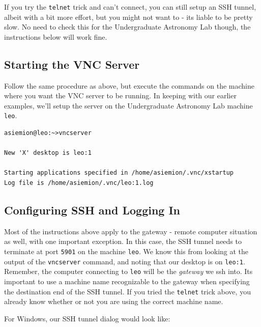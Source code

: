 \documentclass[11pt,preprint]{aastex}
\begin{document}
If you try the \verb$telnet$ trick and can't connect, you can still setup an SSH tunnel, albeit with a bit
more effort, but you might not want to - its liable to be pretty slow.  No need to check this for the Undergraduate Astronomy Lab though, the instructions below will work fine.

\subsection{Starting the VNC Server}

Follow the same procedure as above, but execute the commands on the machine where you want the VNC server to be running.  In keeping with our earlier examples, we'll setup the 
server on the Undergraduate Astronomy Lab machine \verb$leo$.

\begin{verbatim}
asiemion@leo:~>vncserver

New 'X' desktop is leo:1

Starting applications specified in /home/asiemion/.vnc/xstartup
Log file is /home/asiemion/.vnc/leo:1.log
\end{verbatim}

\subsection{Configuring SSH and Logging In}

Most of the instructions above apply to the gateway - remote computer situation as well, with one important exception.  In this case, the SSH tunnel needs to terminate at port \verb$5901$ on the machine \verb$leo$.  
We know this from looking at the output of the \verb$vncserver$ command, and noting that our desktop is on \verb$leo:1$.  Remember, the computer connecting to \verb$leo$ will be the \emph{gateway} we ssh into.  Its important
to use a machine name recognizable to the gateway when specifying the destination end of the SSH tunnel.  If you tried the \verb$telnet$ trick above, you already know whether or not you are using the correct machine name.

\pagebreak

\noindent For Windows, our SSH tunnel dialog would look like:
\end{document}
